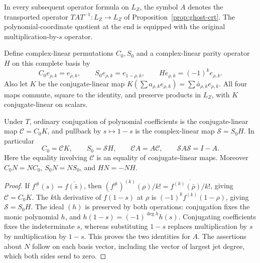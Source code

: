 In every subsequent operator formula on $L_Z$, the symbol $A$ denotes
the transported operator $T A T^{-1}:L_Z\to L_Z$ of
Proposition~\ref{prop:ghost-crt}.  The polynomial-coordinate quotient at
the end is equipped with the original multiplication-by-$s$ operator.

Define complex-linear permutations $C_0,S_0$ and a complex-linear parity
operator $H$ on this complete basis by
\[
 C_0e_{\rho,k}=e_{\bar\rho,k},\qquad
 S_0e_{\rho,k}=e_{1-\rho,k},\qquad
 He_{\rho,k}=(-1)^k e_{\rho,k}.
\]
Also let $K$ be the conjugate-linear map
$K(\sum a_{\rho,k}e_{\rho,k})=\sum\bar a_{\rho,k}e_{\rho,k}$.
All four maps commute, square to the identity, and preserve products in
$L_Z$, with $K$ conjugate-linear on scalars.

\begin{proposition}
\label{prop:ghost-involutions}
Under $T$, ordinary conjugation of polynomial coefficients is the
conjugate-linear map $\mathcal C=C_0K$, and pullback by $s\mapsto1-s$ is
the complex-linear map $\mathcal S=S_0H$.  In particular
\[
 C_0=\mathcal C K,\qquad S_0=\mathcal S H,\qquad
 \mathcal C A=A\mathcal C,\qquad
 \mathcal S A\mathcal S=I-A.
\]
Here the equality involving $\mathcal C$ is an equality of conjugate-linear
maps.  Moreover $C_0N=NC_0$, $S_0N=NS_0$, and $HN=-NH$.
\end{proposition}
\begin{proof}
If $f^\#(s)=\overline{f(\bar s)}$, then
$(f^\#)^{(k)}(\rho)/k!=\overline{f^{(k)}(\bar\rho)/k!}$, giving
$\mathcal C=C_0K$.  The $k$th derivative of $f(1-s)$ at $\rho$ is
$(-1)^kf^{(k)}(1-\rho)$, giving $\mathcal S=S_0H$.  The ideal $(h)$
is preserved by both operations: conjugation fixes the monic polynomial
$h$, and $h(1-s)=(-1)^{\deg h}h(s)$.  Conjugating coefficients fixes the
indeterminate $s$, whereas substituting $1-s$ replaces multiplication by
$s$ by multiplication by $1-s$.  This proves the two identities for $A$.
The assertions about $N$ follow on each basis vector, including the vector
of largest jet degree, which both sides send to zero.
\end{proof}

